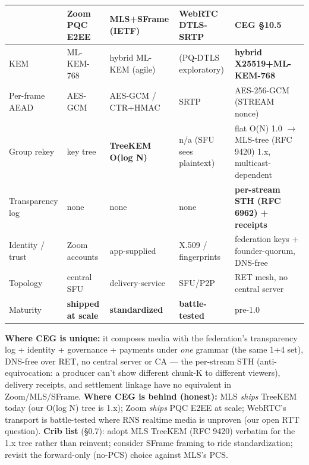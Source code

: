 \documentclass[10pt]{article}
\begin{document}
\begin{center}\scriptsize
\begin{tabular}{|p{2.6cm}|p{2.4cm}|p{2.4cm}|p{2.4cm}|p{3.2cm}|}\hline
 & \textbf{Zoom PQC E2EE} & \textbf{MLS+SFrame (IETF)} & \textbf{WebRTC DTLS-SRTP} & \textbf{CEG \S10.5} \\\hline
KEM & ML-KEM-768 & hybrid ML-KEM (agile) & (PQ-DTLS exploratory) & \textbf{hybrid X25519+ML-KEM-768} \\\hline
Per-frame AEAD & AES-GCM & AES-GCM / CTR+HMAC & SRTP & AES-256-GCM (STREAM nonce) \\\hline
Group rekey & key tree & \textbf{TreeKEM O(log N)} & n/a (SFU sees plaintext) & flat O(N) 1.0 $\rightarrow$ MLS-tree (RFC 9420) 1.x, multicast-dependent \\\hline
Transparency log & none & none & none & \textbf{per-stream STH (RFC 6962) + receipts} \\\hline
Identity / trust & Zoom accounts & app-supplied & X.509 / fingerprints & federation keys + founder-quorum, DNS-free \\\hline
Topology & central SFU & delivery-service & SFU/P2P & RET mesh, no central server \\\hline
Maturity & \textbf{shipped at scale} & \textbf{standardized} & \textbf{battle-tested} & pre-1.0 \\\hline
\end{tabular}
\end{center}

\noindent\textbf{Where CEG is unique:} it composes media with the federation's
transparency log + identity + governance + payments under \emph{one} grammar
(the same 1+4 set), DNS-free over RET, no central server or CA --- the per-stream
STH (anti-equivocation: a producer can't show different chunk-K to different
viewers), delivery receipts, and settlement linkage have no equivalent in
Zoom/MLS/SFrame. \textbf{Where CEG is behind (honest):} MLS \emph{ships} TreeKEM
today (our O(log N) tree is 1.x); Zoom \emph{ships} PQC E2EE at scale; WebRTC's
transport is battle-tested where RNS realtime media is unproven (our open
RTT question). \textbf{Crib list} (\S0.7): adopt MLS TreeKEM (RFC 9420) verbatim
for the 1.x tree rather than reinvent; consider SFrame framing to ride
standardization; revisit the forward-only (no-PCS) choice against MLS's PCS.
\end{document}
